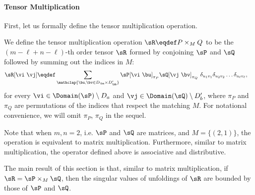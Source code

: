 
% 

\paragraph{Tensor Multiplication}
First, let us formally define the tensor multiplication operation.

\begin{definition}
  We define the tensor multiplication operation $\sR \eqdef P \times_{M}
  Q$ to be the $(m - \ell + n - \ell)$-th order tensor $\sR$ formed by
  conjoining $\sP$ and $\sQ$ followed by summing out the indices in $M$:
\begin{align*}
  \sR[\vi\ \vj] &\eqdef \sum_{\mathclap{\bu, \bv \in D_\ba \times D'_\bb}} \sP[\vi \  \bu]_{\pi_P} \sQ[\vj \  \bv]_{\pi_Q} ~ \delta_{u_1 v_1} \delta_{u_2 v_2} \ldots \delta_{u_\ell v_\ell},
\end{align*}
  for every $\vi \in \Domain(\sP) \setminus D_a$ and $\vj \in
  \Domain(\sQ) \setminus D'_b$, where $\pi_P$ and $\pi_Q$ are
  permutations of the indices that respect the matching $M$. For
  notational convenience, we will omit $\pi_P$, $\pi_Q$ in the sequel.
\end{definition}

Note that when $m, n = 2$, i.e. $\sP$ and $\sQ$ are matrices, and $M
  = \{(2,1)\}$, the operation is equivalent to matrix multiplication. 
Furthermore, similar to matrix multiplication, the operator defined above
  is associative and distributive. 

The main result of this section is that, similar to matrix
multiplication, if $\sR = \sP \times_{M} \sQ$, then the singular values
of unfoldings of $\sR$ are bounded by those of $\sP$ and $\sQ$.

